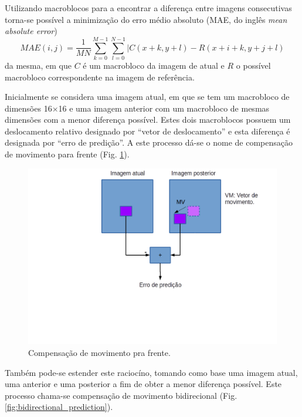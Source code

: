 Utilizando macroblocos para a encontrar a diferença entre imagens consecutivas torna-se possível a minimização do erro médio absoluto (MAE, do inglês \textit{mean absolute error}) 
\begin{equation}
MAE(i,j) = \frac{1}{MN} \sum_{k=0}^{M-1} \sum_{l=0}^{N-1} |C(x+k,y+l)-R(x+i+k,y+j+l)
\end{equation}
da mesma, em que $C$ é um macrobloco da imagem de atual e $R$ o possível macrobloco correspondente na imagem de referência.

Inicialmente se considera uma imagem atual, em que se tem um macrobloco de dimensões 16$ \times $16 e uma imagem anterior com um macrobloco de mesmas dimensões com a menor diferença possível. Estes dois macroblocos possuem um deslocamento relativo designado por ``vetor de deslocamento'' e esta diferença é designada por ``erro de predição''. A este processo dá-se o nome de compensação de movimento para frente (Fig. \ref{fig:foreward_prediction}).

\begin{figure}[!ht]
\begin{center}
\includegraphics[scale=0.5]{./Figures/png/foreward_prediction.png}
\caption{Compensação de movimento pra frente.}
\label{fig:foreward_prediction}
\end{center}
\end{figure}

Também pode-se estender este raciocíno, tomando como base uma imagem atual, uma anterior e uma posterior a fim de obter a menor diferença possível. Este processo chama-se compensação de movimento bidirecional (Fig. \ref{fig:bidirectional_prediction}).

